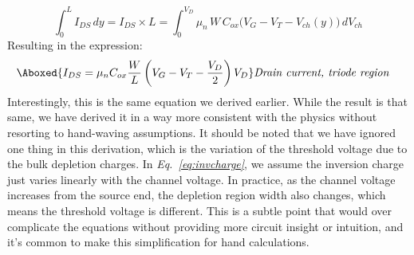     \begin{equation} 
        \int_0^L I_{DS}\,dy = I_{DS} \times L = \int_0^{V_D} \mu_n\,W\,C_{ox}\big(V_G - V_T - V_{ch}(y)\big)\,dV_{ch} 
    \end{equation}
Resulting in the expression:
    \begin{align} 
        \Aboxed{ I_{DS} = \mu_n C_{ox} \frac{W}{L} \left( V_G - V_T - \frac{V_D}{2} \right) V_D } &\textit{Drain current, triode region}
        \label{eq:ids_triode}
    \end{align}
Interestingly, this is the same equation we derived earlier.  While the result is that same, we have derived it in a way more consistent with the physics without resorting to hand-waving assumptions.  It should be noted that we have ignored one thing in this derivation, which is the variation of the threshold voltage due to the bulk depletion charges.  In \emph{Eq.~\ref{eq:invcharge}}, we assume the inversion charge just varies linearly with the channel voltage. In practice, as the channel voltage increases from the source end, the depletion region width also changes, which means the threshold voltage is different. This is a subtle point that would over complicate the equations without providing more circuit insight or intuition, and it's common to make this simplification for hand calculations.

